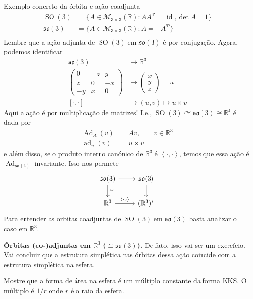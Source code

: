 \begin{thing3}{Exemplo concreto da órbita e ação coadjunta}\leavevmode
	\begin{align*}
		\operatorname{SO}(3)&=\{A\in \mathcal{M}_{3\times 3}(\mathbb{R}):AA^{\mathbf{T}}=\operatorname{id},\det A=1\} \\
		\mathfrak{so}(3) &=\{A\in\mathcal{M}_{3\times 3}(\mathbb{R}):A=-A^{\mathbf{T}}\}\\
	\end{align*}
	Lembre que a ação adjunta de $\operatorname{SO}(3)$ em $\mathfrak{so}(3)$ é por conjugação. Agora, podemos identificar
	\begin{align*}
		 \mathfrak{so}(3) &\longrightarrow \mathbb{R}^{3} \\
		\begin{pmatrix} 0&-z&y\\z&0&-x\\-y&x&0 \end{pmatrix}  &\longmapsto \begin{pmatrix} x\\y\\z \end{pmatrix} =u\\
		[\cdot,\cdot ]& \longmapsto (u,v)\mapsto u\times v
	\end{align*}
Aqui a ação é por multiplicação de matrizes! I.e., $\operatorname{SO}(3) \curvearrowright \mathfrak{so}(3) \cong \mathbb{R}^{3}$ é dada por
\begin{align*}
	\operatorname{Ad}_A(v)&=Av,\qquad v\in\mathbb{R}^{3}\\
	\operatorname{ad}_u(v)&=u\times v
\end{align*}
e além disso, se o produto interno canónico de $\mathbb{R}^{3}$ é $\left<\cdot,\cdot\right> $, temos que essa ação é $\operatorname{Ad}_{\mathfrak{so}(3)}$-invariante. Isso nos permete 
\[\begin{tikzcd}
	\mathfrak{so}(3)\arrow[r]\arrow[d,"\cong "]&\mathfrak{so}(3)\arrow[d]\\
	\mathbb{R}^{3}\arrow[r,"\left<\cdot\text{,} \cdot\right>" ]&(\mathbb{R}^{3})^*
\end{tikzcd}\]
	Para entender as orbitas coadjuntas de $\operatorname{SO}(3)$ em $\mathfrak{so}(3)$ basta analizar o caso em $\mathbb{R}^{3}$.

	{\color{5}\bfseries \'Orbitas (co-)adjuntas em $\mathbb{R}^{3}$ ($\cong \mathfrak{so}(3)$).}\hspace{.5em} De fato, isso vai ser um exercício. Vai concluir que a estrutura simplética nas órbitas dessa ação coincide com a estrutura simplética na esfera.

	\begin{exercise}\leavevmode
		Mostre que a forma de área na esfera é um múltiplo constante da forma  KKS. O múltiplo é $1/r$ onde  $r$ é o raio da esfera.
	\end{exercise}
\end{thing3}

